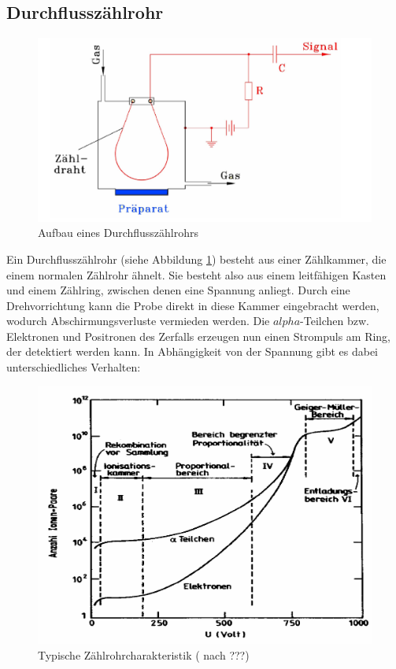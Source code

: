 \subsection{Durchflusszählrohr}
\begin{figure}[H]
 \centering \includegraphics[width=0.9\linewidth]{Bilder/zaehlrohr.png}
 \caption{Aufbau eines Durchflusszählrohrs}
 \label{durchflusszaehlrohr}
\end{figure}
Ein Durchflusszählrohr (siehe Abbildung \ref{durchflusszaehlrohr}) besteht aus einer Zählkammer, die einem normalen Zählrohr ähnelt. Sie besteht also aus einem leitfähigen Kasten und einem Zählring, zwischen denen eine Spannung anliegt. Durch eine Drehvorrichtung kann die Probe direkt in diese Kammer eingebracht werden, wodurch Abschirmungsverluste vermieden werden. Die $alpha$-Teilchen bzw. Elektronen und Positronen des Zerfalls erzeugen nun einen Strompuls am Ring, der detektiert werden kann. In Abhängigkeit von der Spannung gibt es dabei unterschiedliches Verhalten:
\begin{figure}[H]
 \centering \includegraphics[width=0.9\linewidth]{Bilder/zaehlrohrcharakteristik.png}
 \caption{Typische Zählrohrcharakteristik ( nach ???)}
\end{figure}
